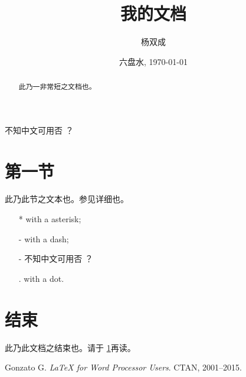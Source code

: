 \documentclass[UTF8,a4paper,12pt]{ctexart}
\begin{document}
\title{我的文档}
\author{杨双成}
\date{六盘水, \today}
\maketitle
\begin{abstract}
   此乃一非常短之文档也。
\end{abstract}
\tableofcontents
\listoftables
\listoffigures
不知中文可用否 ？
\section{第一节}
\label{sec:start}
此乃此节之文本也。参\cite{Gonzato}见详细也。
\begin{itemize}
   \item[*] with a asterisk;
   \item[-] with a dash;
   \item[-] 不知中文可用否 ？
   \item[.] with a dot.
\end{itemize}
\section{结束}
\label{sec:end}
此乃此文档之结束也。请于
\ref{sec:start}再读。
\begin{thebibliography}{99}
    Gonzato G. \textit{\LaTeX{} for  Word Processor
      Users}. CTAN, 2001--2015.
\end{thebibliography}
\end{document}
